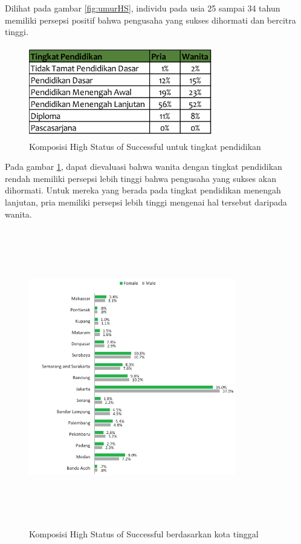 Dilihat pada gambar \ref{fig:umurHS}, individu pada usia 25 sampai 34 tahun memiliki persepsi positif bahwa pengusaha yang sukses dihormati dan bercitra tinggi.

\begin{figure} [H]
	\centering  
	\includegraphics[width=8cm, height=4cm]{pendidikanHS2013} 
	\caption[Komposisi High Status of Successful untuk tingkat pendidikan]{Komposisi High Status of Successful untuk tingkat pendidikan} 
	\label{fig:pendidikanHS} 
\end{figure} 

Pada gambar \ref{fig:pendidikanHS}, dapat dievaluasi bahwa wanita dengan tingkat pendidikan rendah memiliki persepsi lebih tinggi bahwa pengusaha yang sukses akan dihormati. Untuk mereka yang berada pada tingkat pendidikan menengah lanjutan, pria memiliki persepsi lebih tinggi mengenai hal tersebut daripada wanita.

\begin{figure} [H]
	\centering  
	\includegraphics[width=9cm, height=13cm]{lokasiHS2013} 
	\caption[Komposisi High Status of Successful berdasarkan kota tinggal]{Komposisi High Status of Successful berdasarkan kota tinggal} 
	\label{fig:lokasiHS} 
\end{figure} 

